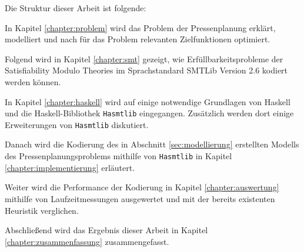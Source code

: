 
Die Struktur dieser Arbeit ist folgende:

In Kapitel \ref{chapter:problem} wird das Problem der Pressenplanung erklärt, modelliert und nach für das Problem relevanten Zielfunktionen optimiert.

Folgend wird in Kapitel \ref{chapter:smt} gezeigt, wie Erfüllbarkeitsprobleme der Satisfiability Modulo Theories im Sprachstandard SMTLib Version 2.6 kodiert werden können.

In Kapitel \ref{chapter:haskell} wird auf einige notwendige Grundlagen von Haskell und die Haskell-Bibliothek \texttt{Hasmtlib} eingegangen.
Zusätzlich werden dort einige Erweiterungen von \texttt{Hasmtlib} diskutiert.

Danach wird die Kodierung des in Abschnitt \ref{sec:modellierung} erstellten Modells des Pressenplanungsproblems mithilfe von \texttt{Hasmtlib}
in Kapitel \ref{chapter:implementierung} erläutert.

Weiter wird die Performance der Kodierung in Kapitel \ref{chapter:auswertung} mithilfe von Laufzeitmessungen ausgewertet und mit der bereits existenten Heuristik verglichen.

Abschließend wird das Ergebnis dieser Arbeit in Kapitel \ref{chapter:zusammenfassung} zusammengefasst.